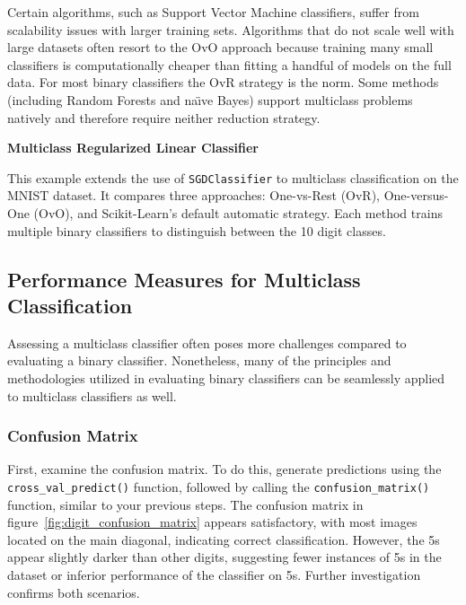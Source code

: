 \documentclass[12pt,letter]{article}
\begin{document}
Certain algorithms, such as Support Vector Machine classifiers, suffer from scalability issues with larger training sets. Algorithms that do not scale well with large datasets often resort to the OvO approach because training many small classifiers is computationally cheaper than fitting a handful of models on the full data. For most binary classifiers the OvR strategy is the norm. Some methods (including Random Forests and na\"{\i}ve Bayes) support multiclass problems natively and therefore require neither reduction strategy.

\begin{example}
\textbf{Multiclass Regularized Linear Classifier}

\noindent This example extends the use of \texttt{SGDClassifier} to multiclass classification on the MNIST dataset. It compares three approaches: One-vs-Rest (OvR), One-versus-One (OvO), and Scikit-Learn's default automatic strategy. Each method trains multiple binary classifiers to distinguish between the 10 digit classes.
\end{example}



\subsection{Performance Measures for Multiclass Classification}


Assessing a multiclass classifier often poses more challenges compared to evaluating a binary classifier. Nonetheless, many of the principles and methodologies utilized in evaluating binary classifiers can be seamlessly applied to multiclass classifiers as well.


\subsubsection{Confusion Matrix}




First, examine the confusion matrix. To do this, generate predictions using the \texttt{cross\_val\_\allowbreak predict()} function, followed by calling the \texttt{confusion\_matrix()} function, similar to your previous steps. The confusion matrix in figure~\ref{fig:digit_confusion_matrix} appears satisfactory, with most images located on the main diagonal, indicating correct classification. However, the 5s appear slightly darker than other digits, suggesting fewer instances of 5s in the dataset or inferior performance of the classifier on 5s. Further investigation confirms both scenarios.
\end{document}
